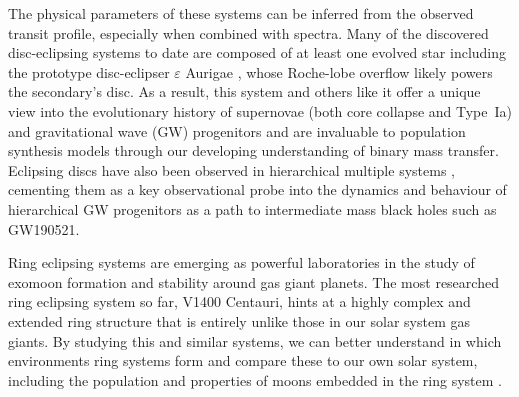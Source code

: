 \documentclass{article}
\begin{document}
The physical parameters of these systems can be inferred from the observed transit profile, especially when combined with spectra. Many of the discovered disc-eclipsing systems to date are composed of at least one evolved star \citep{Torres2022MNRAS} including the prototype disc-eclipser $\varepsilon$ Aurigae \citep{Hoard2010ApJ}, whose Roche-lobe overflow likely powers the secondary's disc. As a result, this system and others like it offer a unique view into the evolutionary history of supernovae (both core collapse and Type~Ia) and gravitational wave (GW) progenitors and are invaluable to population synthesis models through our developing understanding of binary mass transfer. Eclipsing discs have also been observed in hierarchical multiple systems \citep{Kenworthy2022A&A}, cementing them as a key observational probe into the dynamics and behaviour of hierarchical GW progenitors as a path to intermediate mass black holes such as GW190521.

Ring eclipsing systems are emerging as powerful laboratories in the study of exomoon formation and stability around gas giant planets. The most researched ring eclipsing system so far, V1400 Centauri, hints at a highly complex and extended ring structure \citep{Mamajek2012AJ} that is entirely unlike those in our solar system gas giants. By studying this and similar systems, we can better understand in which environments ring systems form and compare these to our own solar system, including the population and properties of moons embedded in the ring system \citep{Kenworthy2015ApJ}. 


\end{document}

